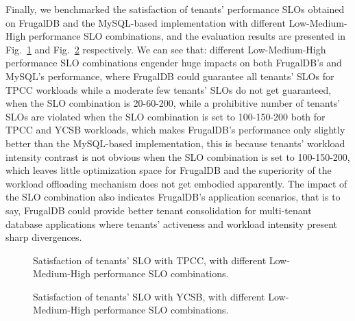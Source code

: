 Finally, we benchmarked the satisfaction of tenants' performance SLOs obtained on FrugalDB and the MySQL-based implementation with different Low-Medium-High performance SLO combinations, and the evaluation results are presented in Fig.~\ref{fig:stps-dlps-1} and Fig.~\ref{fig:stps-dlps-2} respectively. We can see that: different Low-Medium-High performance SLO combinations engender huge impacts on both FrugalDB's and MySQL's performance, where FrugalDB could guarantee all tenants' SLOs for TPCC workloads while a moderate few tenants' SLOs do not get guaranteed, when the SLO combination is 20-60-200, while a prohibitive number of tenants' SLOs are violated when the SLO combination is set to 100-150-200 both for TPCC and YCSB workloads, which makes FrugalDB's performance only slightly better than the MySQL-based implementation, this is because tenants' workload intensity contrast is not obvious when the SLO combination is set to 100-150-200, which leaves little optimization space for FrugalDB and the superiority of the workload offloading mechanism does not get embodied apparently. The impact of the SLO combination also indicates FrugalDB's application scenarios, that is to say, FrugalDB could provide better tenant consolidation for multi-tenant database applications where tenants' activeness and workload intensity present sharp divergences.

\begin{figure}[!htb]
\caption{Satisfaction of tenants' SLO with TPCC, with different Low-Medium-High performance SLO combinations.}
\label{fig:stps-dlps-1}
\end{figure}

\begin{figure}[!htb]
\caption{Satisfaction of tenants' SLO with YCSB, with different Low-Medium-High performance SLO combinations.}
\label{fig:stps-dlps-2}
\end{figure}


